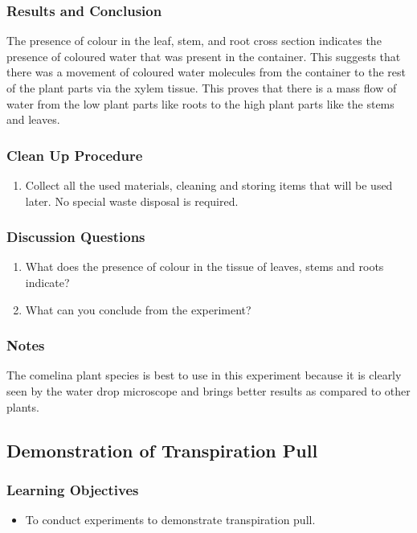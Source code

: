 \subsubsection*{Results and Conclusion}
The presence of colour in the leaf, stem, and root cross section indicates the presence of coloured water that was present in the container. This suggests that there was a movement of coloured water molecules from the container to the rest of the plant parts via the xylem tissue. This proves that there is a mass flow of water from the low plant parts like roots to the high plant parts like the stems and leaves.

\subsubsection*{Clean Up Procedure}
\begin{enumerate}
\item{Collect all the used materials, cleaning and storing items that will be used later. No special waste disposal is required.}
\end{enumerate}

\subsubsection*{Discussion Questions}
\begin{enumerate}
\item{What does the presence of colour in the tissue of leaves, stems and roots indicate?}
\item{What can you conclude from the experiment?}
\end{enumerate}

\subsubsection*{Notes}
 The comelina plant species is best to use in this experiment because it is clearly seen by the water drop microscope and brings better results as compared to other plants.

\subsection{Demonstration of Transpiration Pull}

\subsubsection*{Learning Objectives}
\begin{itemize}
\item{To conduct experiments to demonstrate transpiration pull.}
\end{itemize}


